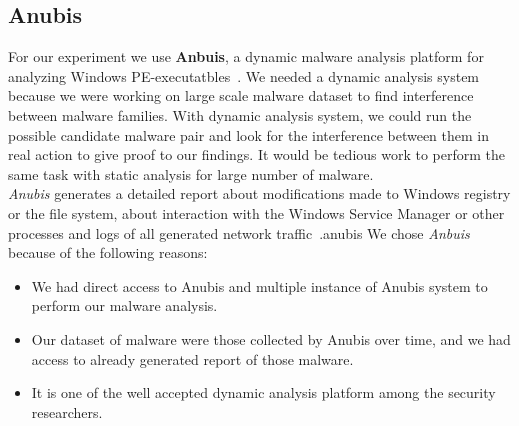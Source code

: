 \subsection{Anubis}
\label{sub:Anubis}
For our experiment we use \textbf{Anbuis}, a dynamic malware analysis platform for analyzing Windows PE-executatbles~\cite[]{anubis}.
We needed a dynamic analysis system because we were working on large scale malware dataset to find interference between malware families.
With dynamic analysis system, we could run the possible candidate malware pair and look for the interference between them in real action to give proof to our findings.
It would be tedious work to perform the same task with static analysis for large number of malware.\\
\emph{Anubis} generates a detailed report about modifications made to Windows registry or the file system, about interaction with the Windows Service Manager or other processes and logs of all generated network traffic~\cite[]{anubis}.anubis
We chose \emph{Anbuis} because of the following reasons:
\begin{itemize}
  \item We had direct access to Anubis and multiple instance of Anubis system to perform our malware analysis.
  \item Our dataset of malware were those collected by Anubis over time, and we had access to already generated report of those malware.
  \item It is one of the well accepted dynamic analysis platform among the security researchers.
\end{itemize}

